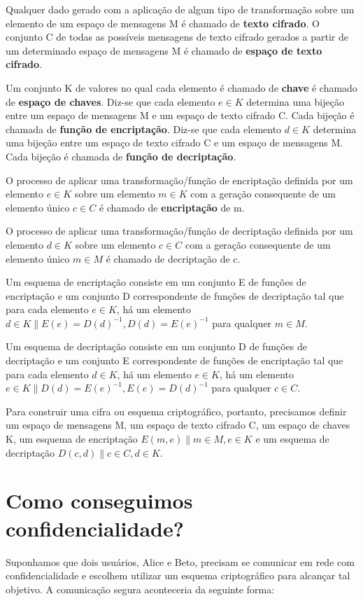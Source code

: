 \documentclass[
	10pt,				%
	openright,			%
	twoside,			%
	a5paper,			%
	english,			%
	french,				%
	spanish,			%
	brazil,				%
	sumario=tradicional
]{abntex2}
\begin{document}
Qualquer dado gerado com a aplicação de algum tipo de transformação sobre um elemento de um espaço de mensagens M é chamado de \textbf{texto cifrado}. O conjunto C de todas as possíveis mensagens de texto cifrado gerados a partir de um determinado espaço de mensagens M é chamado de \textbf{espaço de texto cifrado}.

Um conjunto K de valores no qual cada elemento é chamado de \textbf{chave} é chamado de \textbf{espaço de chaves}. Diz-se que cada elemento $e \in K$ determina uma bijeção entre um espaço de mensagens M e um espaço de texto cifrado C. Cada bijeção é chamada de \textbf{função de encriptação}. Diz-se que cada elemento $d \in K$ determina uma bijeção entre um espaço de texto cifrado C e um espaço de mensagens M. Cada bijeção é chamada de \textbf{função de decriptação}.

O processo de aplicar uma transformação/função de encriptação definida por um elemento $e \in K$ sobre um elemento $m \in K$ com a geração consequente de um elemento único $c \in C$ é chamado de \textbf{encriptação} de m.

O processo de aplicar uma transformação/função de decriptação definida por um elemento $d \in K$ sobre um elemento $c \in C$ com a geração consequente de um elemento único $m \in M$ é chamado de decriptação de c.

Um esquema de encriptação consiste em um conjunto E de funções de encriptação e um conjunto D correspondente de funções de decriptação tal que para cada elemento $e \in K$, há um elemento $d \in K \| E(e) = D(d)^{-1}, D(d) = E(e)^{-1}$ para qualquer $m \in M$.

Um esquema de decriptação consiste em um conjunto D de funções de decriptação e um conjunto E correspondente de funções de encriptação tal que para cada elemento $d \in K$, há um elemento $e \in K$, há um elemento $e \in K \| D(d) = E(e)^{-1}, E(e) = D(d)^{-1}$ para qualquer $c \in C$.

Para construir uma cifra ou esquema criptográfico, portanto, precisamos definir um espaço de mensagens M, um espaço de texto cifrado C, um espaço de chaves K, um esquema de encriptação $E(m, e) \| m \in M, e \in K$ e um esquema de decriptação $D(c, d) \| c \in C, d \in K$.

\section{Como conseguimos confidencialidade?}

Suponhamos que dois usuários, Alice e Beto, precisam se comunicar em rede com confidencialidade e escolhem utilizar um esquema criptográfico para alcançar tal objetivo. A comunicação segura aconteceria da seguinte forma:
\end{document}
